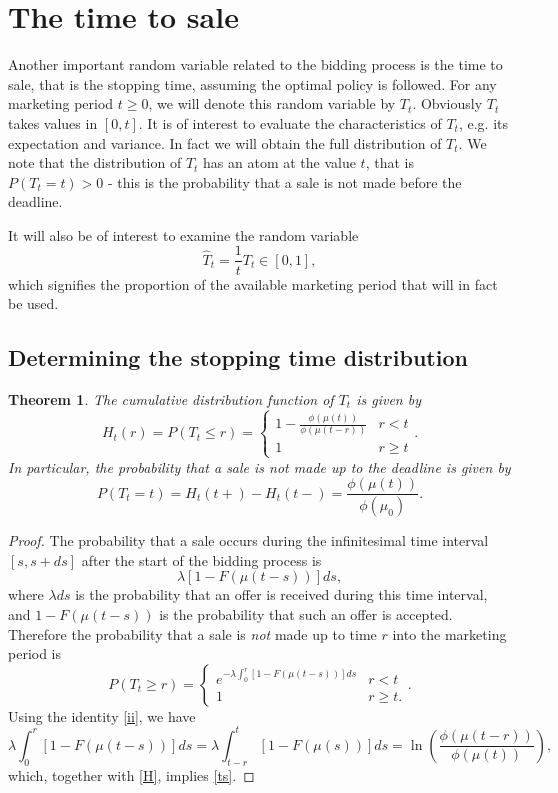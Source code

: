 \documentclass{article}
\newtheorem{thm}{Theorem}[section]
\numberwithin{equation}{section}
\begin{document}
\section{The time to sale}
\label{time_to_sale}

Another important random variable related to the 
bidding process is the time to sale, that is the stopping time, assuming the optimal policy is followed. For any marketing period $t\geq 0$, we will denote this random variable by $T_t$.
Obviously $T_t$ takes values in $[0,t]$.
It is of interest to evaluate the characteristics of $T_t$, e.g. its expectation and variance. In fact we will obtain the full distribution of $T_t$. 
We note that the distribution of $T_t$ has an
atom at the value $t$, that is $P(T_t=t)>0$ - this is the probability that a sale is not made before the deadline. 

It will also be of interest to examine the random variable
\begin{equation}\label{htt}\hat{T}_t=\frac{1}{t}T_t\in [0,1],\end{equation}
which signifies the proportion of 
the available marketing period that will in fact be used.

\subsection{Determining the stopping time distribution}

\begin{thm}\label{tts}
The cumulative distribution function of $T_t$ is given by
\begin{equation}\label{ts}H_t(r)=P(T_t\leq r)=\begin{cases}
		1-\frac{\phi(\mu(t))}{\phi(\mu(t-r))} & r<t\\
		1 & r\geq t
	\end{cases}.
\end{equation}
In particular, the 
probability that a sale is not made 
up to the deadline is given by
$$P(T_t=t)=H_t(t+)-H_t(t-)=\frac{\phi(\mu(t))}{\phi(\mu_0)}.$$
\end{thm}

\begin{proof}
The probability that a sale occurs during
the infinitesimal time interval $[s,s+ds]$ after the 
start of the bidding process is
$$\lambda [1-F(\mu(t-s))]ds,$$
where $\lambda ds$ is the probability that
an offer is received during this time interval, and $1-F(\mu(t-s))$
is the probability that such an offer is accepted. Therefore the probability that
a sale is {\it{not}} made up to time $r$ into the marketing period is
\begin{equation}\label{H}P(T_t\geq r)=\begin{cases}
		e^{-\lambda\int_0^r [1-F(\mu(t-s))]ds} & r<t\\
		1 & r\geq t.
	\end{cases}.\end{equation}
Using the identity \eqref{ii}, we have
$$\lambda\int_0^r [1-F(\mu(t-s))]ds=\lambda\int_{t-r}^t [1-F(\mu(s))]ds=
\ln\left(\frac{\phi(\mu(t-r))}{\phi(\mu(t))}\right),$$
which, together with \eqref{H}, implies \eqref{ts}.
\end{proof}
\end{document}
